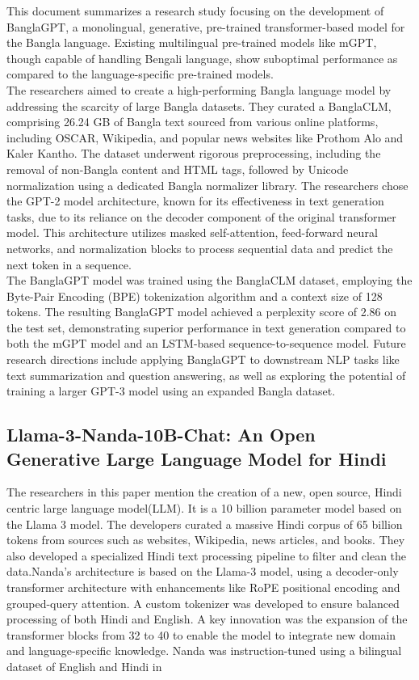 This document summarizes a research study focusing on the development of BanglaGPT, a monolingual, generative, pre-trained transformer-based model for the Bangla language. Existing multilingual pre-trained models like mGPT, though capable of handling Bengali language, show suboptimal performance as compared to the language-specific pre-trained models.\\
\cite{BanglaGPT:1}The researchers aimed to create a high-performing Bangla language model by addressing the scarcity of large Bangla datasets. They curated a BanglaCLM, comprising 26.24 GB of Bangla text sourced from various online platforms, including OSCAR, Wikipedia, and popular news websites like Prothom Alo and Kaler Kantho. The dataset underwent rigorous preprocessing, including the removal of non-Bangla content and HTML tags, followed by Unicode normalization using a dedicated Bangla normalizer library.
The researchers chose the GPT-2 model architecture, known for its effectiveness in text generation tasks, due to its reliance on the decoder component of the original transformer model. This architecture utilizes masked self-attention, feed-forward neural networks, and normalization blocks to process sequential data and predict the next token in a sequence.\\
The BanglaGPT model was trained using the BanglaCLM dataset, employing the Byte-Pair Encoding (BPE) tokenization algorithm and a context size of 128 tokens. The resulting BanglaGPT model achieved a perplexity score of 2.86 on the test set, demonstrating superior performance in text generation compared to both the mGPT model and an LSTM-based sequence-to-sequence model. Future research directions include applying BanglaGPT to downstream NLP tasks like text summarization and question answering, as well as exploring the potential of training a larger GPT-3 model using an expanded Bangla dataset.

\subsection{Llama-3-Nanda-10B-Chat: An Open Generative Large Language Model for Hindi}

The researchers in this paper \cite{Llama3:1} mention the creation of a new, open source, Hindi centric large language model(LLM). It is a 10 billion parameter model based on the Llama 3 model. The developers curated a massive Hindi corpus of 65 billion tokens from sources such as websites, Wikipedia, news articles, and books. They also developed a specialized Hindi text processing pipeline to filter and clean the data.Nanda’s architecture is based on the Llama-3 model, using a decoder-only transformer architecture with enhancements like RoPE positional encoding and grouped-query attention. A custom tokenizer was developed to ensure balanced processing of both Hindi and English. A key innovation was the expansion of the transformer blocks from 32 to 40 to enable the model to integrate new domain and language-specific knowledge. Nanda was instruction-tuned using a bilingual dataset of English and Hindi in

